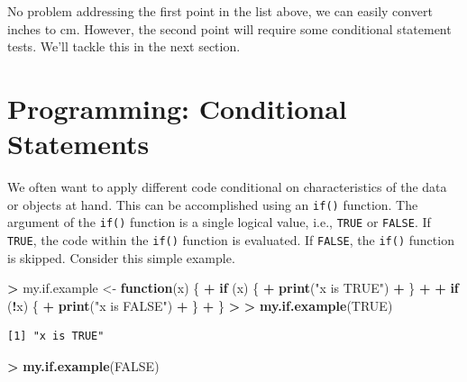 \documentclass[]{krantz}
\makeatletter
\newenvironment{Shaded}{\begin{snugshade}}{\end{snugshade}}
\newcommand{\ControlFlowTok}[1]{\textcolor[rgb]{0.27,0.27,0.27}{\textbf{#1}}}
\newcommand{\ErrorTok}[1]{\textcolor[rgb]{0.14,0.14,0.14}{\textbf{#1}}}
\newcommand{\KeywordTok}[1]{\textcolor[rgb]{0.27,0.27,0.27}{\textbf{#1}}}
\newcommand{\NormalTok}[1]{#1}
\newcommand{\OperatorTok}[1]{\textcolor[rgb]{0.43,0.43,0.43}{\textbf{#1}}}
\newcommand{\OtherTok}[1]{\textcolor[rgb]{0.37,0.37,0.37}{#1}}
\newcommand{\StringTok}[1]{\textcolor[rgb]{0.5,0.5,0.5}{#1}}
\newenvironment{kframe}{%
\medskip{}
\setlength{\fboxsep}{.8em}
 \def\at@end@of@kframe{}%
 \ifinner\ifhmode%
  \def\at@end@of@kframe{\end{minipage}}%
  \begin{minipage}{\columnwidth}%
 \fi\fi%
 \def\FrameCommand##1{\hskip\@totalleftmargin \hskip-\fboxsep
 \colorbox{shadecolor}{##1}\hskip-\fboxsep
     \hskip-\linewidth \hskip-\@totalleftmargin \hskip\columnwidth}%
 \MakeFramed {\advance\hsize-\width
   \@totalleftmargin\z@ \linewidth\hsize
   \@setminipage}}%
 {\par\unskip\endMakeFramed%
 \at@end@of@kframe}
\renewenvironment{Shaded}{\begin{kframe}}{\end{kframe}}
\makeatother
\begin{document}
No problem addressing the first point in the list above, we can easily convert inches to cm. However, the second point will require some conditional statement tests. We'll tackle this in the next section.

\hypertarget{programming-conditional-statements}{%
\section{Programming: Conditional Statements}\label{programming-conditional-statements}}

We often want to apply different code conditional on characteristics of the data or objects at hand. This can be accomplished using an \texttt{if()} function. The argument of the \texttt{if()} function is a single logical value, i.e., \texttt{TRUE} or \texttt{FALSE}. If \texttt{TRUE}, the code within the \texttt{if()} function is evaluated. If \texttt{FALSE}, the \texttt{if()} function is skipped. Consider this simple example.

\begin{Shaded}
\begin{Highlighting}[]
\OperatorTok{>}\StringTok{ }\NormalTok{my.if.example <-}\StringTok{ }\ControlFlowTok{function}\NormalTok{(x) \{}
\OperatorTok{+}\StringTok{   }\ControlFlowTok{if}\NormalTok{ (x) \{}
\OperatorTok{+}\StringTok{     }\KeywordTok{print}\NormalTok{(}\StringTok{"x is TRUE"}\NormalTok{)}
\OperatorTok{+}\StringTok{   }\NormalTok{\}}
\OperatorTok{+}\StringTok{   }
\OperatorTok{+}\StringTok{   }\ControlFlowTok{if}\NormalTok{ (}\OperatorTok{!}\NormalTok{x) \{}
\OperatorTok{+}\StringTok{     }\KeywordTok{print}\NormalTok{(}\StringTok{"x is FALSE"}\NormalTok{)}
\OperatorTok{+}\StringTok{   }\NormalTok{\}}
\OperatorTok{+}\StringTok{ }\NormalTok{\}}
\OperatorTok{>}\StringTok{ }
\ErrorTok{>}\StringTok{ }\KeywordTok{my.if.example}\NormalTok{(}\OtherTok{TRUE}\NormalTok{)}
\end{Highlighting}
\end{Shaded}

\begin{verbatim}
[1] "x is TRUE"
\end{verbatim}

\begin{Shaded}
\begin{Highlighting}[]
\OperatorTok{>}\StringTok{ }\KeywordTok{my.if.example}\NormalTok{(}\OtherTok{FALSE}\NormalTok{)}
\end{Highlighting}
\end{Shaded}
\end{document}
